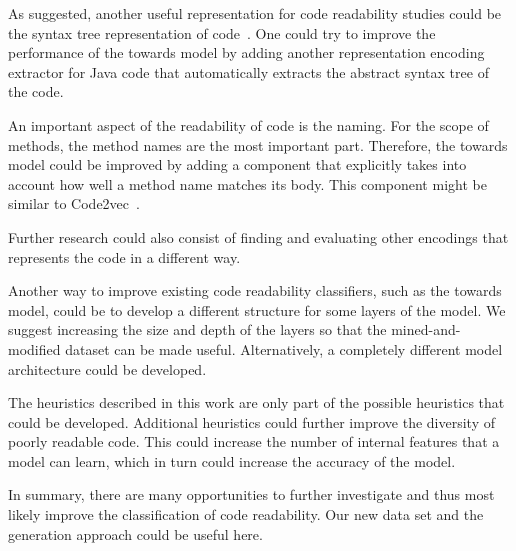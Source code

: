 \documentclass[%
class=scrreprt,
chapterprefix=false,%
open=right,%
twoside=false,%
paper=a4,%
logofile={Logo\_zentral\_farbig\_EN.png},%
thesistype=master,%
UKenglish,%
]{se2thesis}
\theoremstyle{definition}
\begin{document}
	
	As \citeauthor{mi2023graph} suggested, another useful representation for code readability studies could be the syntax tree representation of code~\cite{mi2023graph}. One could try to improve the performance of the towards model by adding another representation encoding extractor for Java code that automatically extracts the abstract syntax tree of the code.
	
	An important aspect of the readability of code is the naming. For the scope of methods, the method names are the most important part. Therefore, the towards model could be improved by adding a component that explicitly takes into account how well a method name matches its body. This component might be similar to Code2vec~\cite{alon2019code2vec}.
	
	Further research could also consist of finding and evaluating other encodings that represents the code in a different way.
	
	Another way to improve existing code readability classifiers, such as the towards model, could be to develop a different structure for some layers of the model. We suggest increasing the size and depth of the layers so that the mined-and-modified dataset can be made useful. Alternatively, a completely different model architecture could be developed. 
	
	The heuristics described in this work are only part of the possible heuristics that could be developed. Additional heuristics could further improve the diversity of poorly readable code. This could increase the number of internal features that a model can learn, which in turn could increase the accuracy of the model.
	
	In summary, there are many opportunities to further investigate and thus most likely improve the classification of code readability. Our new data set and the generation approach could be useful here.
	
\backmatter
\end{document}
